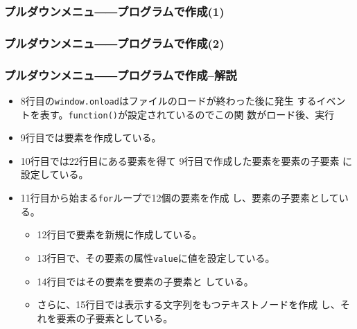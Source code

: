 \begin{frame}[containsverbatim]
 \frametitle{プルダウンメニュ――プログラムで作成(1)}
\end{frame}
\begin{frame}[containsverbatim]
 \frametitle{プルダウンメニュ――プログラムで作成(2)}
\end{frame}
\begin{frame}[containsverbatim]
 \frametitle{プルダウンメニュ――プログラムで作成--解説}
\begin{itemize}
 \item 8行目の\texttt{window.onload}はファイルのロードが終わった後に発生
       するイベントを表す。\texttt{function()}が設定されているのでこの関
       数がロード後、実行
 \item 9行目では要素を作成している。
 \item 10行目では22行目にある要素を得て
  9行目で作成した要素を要素の子要素
       に設定している。
 \item 11行目から始まる\texttt{for}ループで12個の要素を作成
       し、要素の子要素としている。
       \begin{itemize}
	\item 12行目で要素を新規に作成している。
	\item 13行目で、その要素の属性\texttt{value}に値を設定している。
	\item 14行目ではその要素を要素の子要素と
	      している。
	\item さらに、15行目では表示する文字列をもつテキストノードを作成
	      し、それを要素の子要素としている。
       \end{itemize}
\end{itemize}
\end{frame}
\newcommand{\DOMP}{\texttt}
